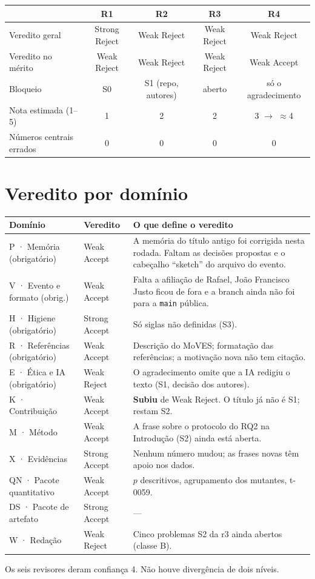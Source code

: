 \documentclass[10pt,a4paper]{article}
\newcommand{\vSR}{\cellcolor{SR}Strong Reject}
\newcommand{\vWR}{\cellcolor{WR}Weak Reject}
\newcommand{\vWA}{\cellcolor{WA}Weak Accept}
\newcommand{\vSA}{\cellcolor{SA}Strong Accept}
\begin{document}
\begin{center}
\begin{tabular}{@{}lcccc@{}}
\toprule
 & \textbf{R1} & \textbf{R2} & \textbf{R3} & \textbf{R4}\\
\midrule
Veredito geral & \vSR & \vWR & \vWR & \vWR\\
Veredito no mérito & \vWR & \vWR & \vWR & \vWA\\
Bloqueio & S0 & S1 (repo, autores) & aberto & \cellcolor{WR}só o agradecimento\\
Nota estimada (1--5) & 1 & 2 & 2 & 3 $\rightarrow$ $\approx$4\\
Números centrais errados & 0 & 0 & 0 & 0\\
\bottomrule
\end{tabular}
\end{center}

\section{Veredito por domínio}

{\small
\begin{xltabular}{\linewidth}{@{}l>{\centering\arraybackslash}p{2.6cm}X@{}}
\toprule
\textbf{Domínio} & \textbf{Veredito} & \textbf{O que define o veredito}\\
\midrule\endhead
P · Memória (obrigatório) & \vWA & A memória do título antigo foi corrigida nesta rodada. Faltam as decisões propostas e o cabeçalho ``sketch'' do arquivo do evento.\\
V · Evento e formato (obrig.) & \vWA & Falta a afiliação de Rafael, João Francisco Justo ficou de fora e a branch ainda não foi para a \texttt{main} pública.\\
H · Higiene (obrigatório) & \vSA & Só siglas não definidas (S3).\\
R · Referências (obrigatório) & \vWA & Descrição do MoVES; formatação das referências; a motivação nova não tem citação.\\
E · Ética e IA (obrigatório) & \vWR & O agradecimento omite que a IA redigiu o texto (S1, decisão dos autores).\\
K · Contribuição & \vWA & \textbf{Subiu} de Weak Reject. O título já não é S1; restam S2.\\
M · Método & \vWA & A frase sobre o protocolo do RQ2 na Introdução (S2) ainda está aberta.\\
X · Evidências & \vSA & Nenhum número mudou; as frases novas têm apoio nos dados.\\
QN · Pacote quantitativo & \vWA & $p$ descritivos, agrupamento dos mutantes, t-0059.\\
DS · Pacote de artefato & \vSA & ---\\
W · Redação & \vWR & Cinco problemas S2 da r3 ainda abertos (classe B).\\
\bottomrule
\end{xltabular}}
{\small\color{muted}Os seis revisores deram confiança 4. Não houve divergência de dois níveis.}
\end{document}
